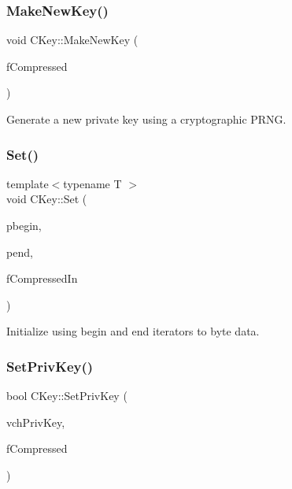 \mbox{\label{class_c_key_a9d12ed9d297e4286250fd7ea6b59e1a5}} 
\subsubsection{\texorpdfstring{Make\+New\+Key()}{MakeNewKey()}}
{\footnotesize\ttfamily void C\+Key\+::\+Make\+New\+Key (\begin{DoxyParamCaption}\item[{bool}]{f\+Compressed }\end{DoxyParamCaption})}



Generate a new private key using a cryptographic P\+R\+NG. 

\mbox{\label{class_c_key_aaa13d5f08456bba094210c5eeabf64c8}} 
\subsubsection{\texorpdfstring{Set()}{Set()}}
{\footnotesize\ttfamily template$<$typename T $>$ \\
void C\+Key\+::\+Set (\begin{DoxyParamCaption}\item[{const T}]{pbegin,  }\item[{const T}]{pend,  }\item[{bool}]{f\+Compressed\+In }\end{DoxyParamCaption})\hspace{0.3cm}{\ttfamily [inline]}}



Initialize using begin and end iterators to byte data. 

\mbox{\label{class_c_key_aa62c082c9037565fce02b457cc335e7b}} 
\subsubsection{\texorpdfstring{Set\+Priv\+Key()}{SetPrivKey()}}
{\footnotesize\ttfamily bool C\+Key\+::\+Set\+Priv\+Key (\begin{DoxyParamCaption}\item[{const \mbox{\hyperlink{key_8h_a1da569b8b6e5b3fa1196cc1b877e7f54}{C\+Priv\+Key}} \&}]{vch\+Priv\+Key,  }\item[{bool}]{f\+Compressed }\end{DoxyParamCaption})}




